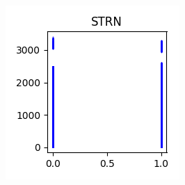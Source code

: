 \documentclass[sigconf,authorversion]{acmart}
\begin{document}
\begin{figure}[htb]
\begin{subfigure}[b]{0.3\textwidth}
        \label{fig:strm}
    \end{subfigure}
    \begin{subfigure}[b]{0.3\textwidth}
        \includegraphics[width=\textwidth]{img/STRN.png}
        \label{fig:strn}
    \end{subfigure}
\end{figure}
\end{document}
